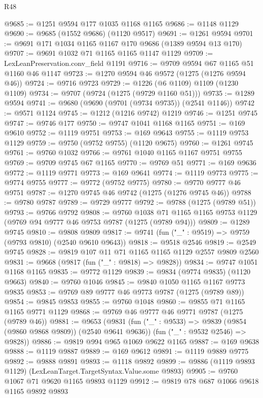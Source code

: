 \begin{lexlean}{R48}
\begin{coremodule}
@9685 := @1251 @9594 @177 @1035 @1168 @1165
@9686 := @1148 @1129
@9690 := @9685 (@1552 @9686) (@1120 @9517)
@9691 := @1261 @9594
@9701 := @9691 @171 @1034 @1165 @1167 @170 @9686 (@1389 @9594 @13 @170)
@9707 := @9691 @1032 @71 @1165 @1165 @1147 @1129
@9709 := LexLeanPreservation.conv_field @1191
@9716 := @9709 @9594 @67 @1165 @51 @1160 @46 @1147
@9723 := @1270 @9594 @46 @9572 (@1275 (@1276 @9594 @46))
@9724 := @9716 @9723
@9729 := @1226 (@6 @1109) @1109 (@1230 @1109)
@9734 := @9707 (@9724 (@1275 (@9729 @1160 @51)))
@9735 := @1289 @9594
@9741 := @9680 (@9690 (@9701 (@9734 @9735)) (@2541 @1146))
@9742 := @9571 @1124
@9745 := @1212 (@1216 @9742) @1219
@9746 := @1251 @9745
@9747 := @9746 @177
@9750 := @9747 @1041 @1168 @1165
@9751 := @169 @9610
@9752 := @1119 @9751
@9753 := @169 @9643
@9755 := @1119 @9753 @1129
@9759 := @9750 (@9752 @9755) (@1120 @9675)
@9760 := @1261 @9745
@9761 := @9760 @1032
@9766 := @9761 @1040 @1165 @1167 @9751 @9755
@9769 := @9709 @9745 @67 @1165
@9770 := @9769 @51
@9771 := @169 @9636
@9772 := @1119 @9771
@9773 := @169 @9641
@9774 := @1119 @9773
@9775 := @9774 @9755
@9777 := @9772 (@9752 @9775)
@9780 := @9770 @9777 @46 @9751
@9787 := @1270 @9745 @46 @9742 (@1275 (@1276 @9745 @46))
@9788 := @9780 @9787
@9789 := @9729 @9777
@9792 := @9788 (@1275 (@9789 @51))
@9793 := @9766 @9792
@9808 := @9760
    @1038
    @71
    @1165
    @1165
    @9753
    @1129
    (@9769 @94 @9777 @46 @9753 @9787 (@1275 (@9789 @94)))
@9809 := @1289 @9745
@9810 := @9808 @9809
@9817 := @9741 (fun ("_" : @9519) => @9759 (@9793 @9810) (@2540 @9610 @9643))
@9818 := @9518 @2546
@9819 := @2549 @9745
@9828 := @9819 @107 @11 @71 @1165 @1165 @1129 @2557 @9809 @2560
@9831 := @9668 (@9817 (fun ("_" : @9818) => @9828))
@9834 := @9747 @1051 @1168 @1165
@9835 := @9772 @1129
@9839 := @9834 (@9774 @9835) (@1120 @9663)
@9840 := @9760 @1046
@9845 := @9840 @1050 @1165 @1167 @9773 @9835
@9853 := @9769 @89 @9777 @46 @9773 @9787 (@1275 (@9789 @89))
@9854 := @9845 @9853
@9855 := @9760 @1048
@9860 := @9855 @71 @1165 @1165 @9771 @1129
@9868 := @9769 @46 @9777 @46 @9771 @9787 (@1275 (@9789 @46))
@9881 := @9653
    (@9831
      (fun ("_" : @9533) => @9839 (@9854 (@9860 @9868 @9809)) (@2540 @9641 @9636))
      (fun ("_" : @9532 @2546) => @9828))
@9886 := @9819 @994 @965 @1069 @9622 @1165
@9887 := @169 @9638
@9888 := @1119 @9887
@9889 := @169 @9612
@9891 := @1119 @9889 @9775
@9892 := @9888 @9891
@9893 := @1118 @9892
@9899 := @9886 (@1119 @9893 @1129) (LexLeanTarget.TargetSyntax.Value.some @9893)
@9905 := @9760 @1067 @71 @9620 @1165 @9893 @1129
@9912 := @9819 @78 @687 @1066 @9618 @1165 @9892 @9893

\end{coremodule}
\end{lexlean}
